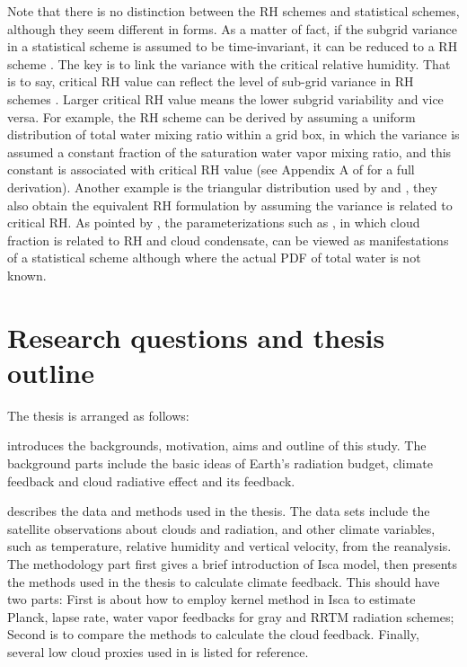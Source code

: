 Note that there is no distinction between the RH schemes and statistical schemes, although they seem different in forms. As a matter of fact, if the subgrid variance in a statistical scheme is assumed to be time-invariant, it can be reduced to a RH scheme \citep{Tompkins2002,Tompkins2005}. The key is to link the variance with the critical relative humidity. That is to say, critical RH value can reflect the level of sub-grid variance in RH schemes \citep{Quaas2012}. Larger critical RH value means the lower subgrid variability and vice versa. For example, the \cite{Sundqvist1978} RH scheme can be derived by assuming a uniform distribution of total water mixing ratio within a grid box, in which the variance is assumed a constant fraction of the saturation water vapor mixing ratio, and this constant is associated with critical RH value (see Appendix A of \cite{Quaas2012} for a full derivation). Another example is the triangular distribution used by \cite{Smith1990} and \cite{Park2014}, they also obtain the equivalent RH formulation by assuming the variance is related to critical RH. As pointed by \cite{Tompkins2002}, the parameterizations such as \cite{Xu1996}, in which cloud fraction is related to RH and cloud condensate, can be viewed as manifestations of a statistical scheme although where the actual PDF of total water is not known. %

\section{Research questions and thesis outline}
\label{sec:thesis_layout}

The thesis is arranged as follows:

 introduces the backgrounds, motivation, aims and outline of this study. The background parts include the basic ideas of Earth's radiation budget, climate feedback and cloud radiative effect and its feedback.

 describes the data and methods used in the thesis. The data sets include the satellite observations about clouds and radiation, and other climate variables, such as temperature, relative humidity and vertical velocity, from the reanalysis. The methodology part first gives a brief introduction of Isca model, then presents the methods used in the thesis to calculate climate feedback. This should have two parts: First is about how to employ kernel method in Isca to estimate Planck, lapse rate, water vapor feedbacks for gray and RRTM radiation schemes; Second is to compare the methods to calculate the cloud feedback. Finally, several low cloud proxies used in  is listed for reference.

